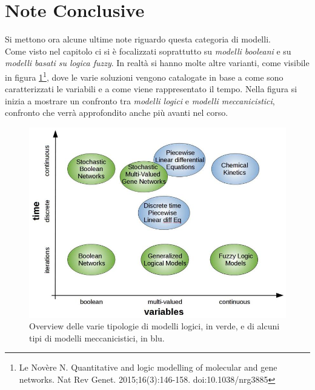 \documentclass[a4paper,12pt, oneside]{book}
\begin{document}
\section{Note Conclusive}
Si mettono ora alcune ultime note riguardo questa categoria di modelli.\\
Come visto nel capitolo ci si è focalizzati soprattutto su \textit{modelli
  booleani} e su \textit{modelli basati su logica fuzzy}. In realtà si hanno
molte altre varianti, come visibile in figura \ref{fig:logmod}\footnote{Le
  Novère N. Quantitative and logic modelling of molecular and gene networks. Nat
  Rev Genet. 2015;16(3):146-158. doi:10.1038/nrg3885}, dove le varie soluzioni
vengono catalogate in base a come sono caratterizzati le variabili e a come
viene rappresentato il tempo. Nella figura si inizia a mostrare un confronto tra
\textit{modelli logici} e \textit{modelli meccanicistici}, confronto che verrà
approfondito anche più avanti nel corso.
\begin{figure}
  \centering
  \includegraphics[scale = 0.8]{img/logmod.jpg}
  \caption{Overview delle varie tipologie di modelli logici, in verde, e di
    alcuni tipi di modelli meccanicistici, in blu.}
  \label{fig:logmod}
\end{figure}
\end{document}
